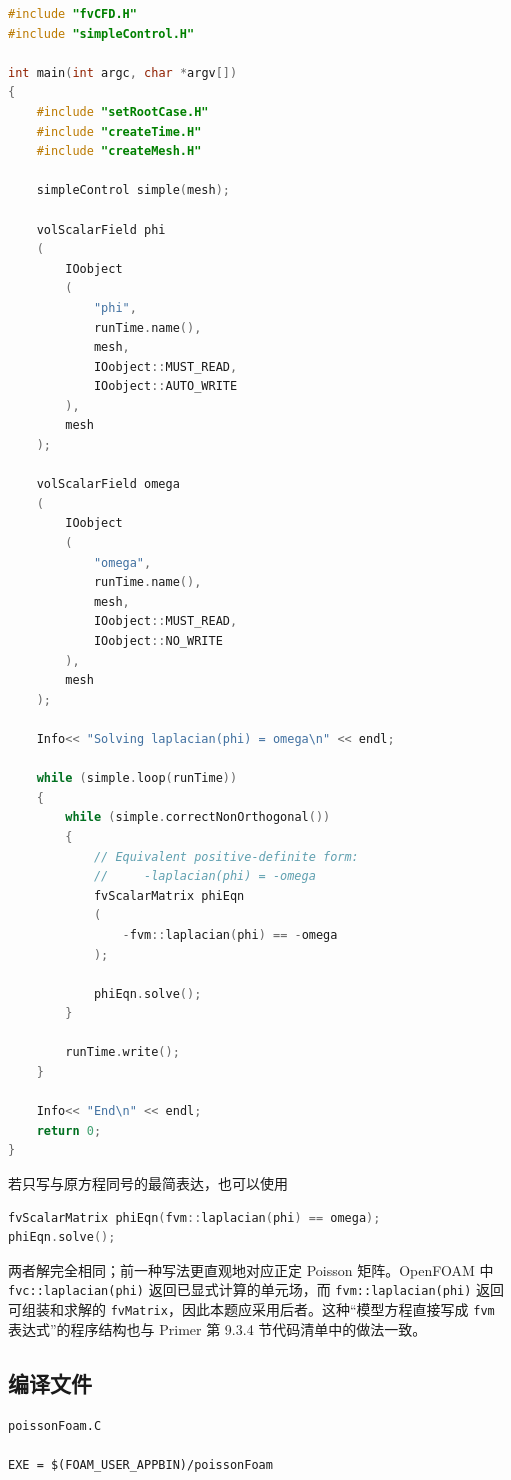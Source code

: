 \documentclass[UTF8,a4paper,11pt]{ctexart}
\begin{document}
\begin{lstlisting}[language=C++,caption={poissonFoam.C}]
#include "fvCFD.H"
#include "simpleControl.H"

int main(int argc, char *argv[])
{
    #include "setRootCase.H"
    #include "createTime.H"
    #include "createMesh.H"

    simpleControl simple(mesh);

    volScalarField phi
    (
        IOobject
        (
            "phi",
            runTime.name(),
            mesh,
            IOobject::MUST_READ,
            IOobject::AUTO_WRITE
        ),
        mesh
    );

    volScalarField omega
    (
        IOobject
        (
            "omega",
            runTime.name(),
            mesh,
            IOobject::MUST_READ,
            IOobject::NO_WRITE
        ),
        mesh
    );

    Info<< "Solving laplacian(phi) = omega\n" << endl;

    while (simple.loop(runTime))
    {
        while (simple.correctNonOrthogonal())
        {
            // Equivalent positive-definite form:
            //     -laplacian(phi) = -omega
            fvScalarMatrix phiEqn
            (
                -fvm::laplacian(phi) == -omega
            );

            phiEqn.solve();
        }

        runTime.write();
    }

    Info<< "End\n" << endl;
    return 0;
}
\end{lstlisting}

若只写与原方程同号的最简表达，也可以使用
\begin{lstlisting}[language=C++]
fvScalarMatrix phiEqn(fvm::laplacian(phi) == omega);
phiEqn.solve();
\end{lstlisting}
两者解完全相同；前一种写法更直观地对应正定 Poisson 矩阵。OpenFOAM 中
\texttt{fvc::\allowbreak laplacian(phi)} 返回已显式计算的单元场，而
\texttt{fvm::\allowbreak laplacian(phi)} 返回可组装和求解的
\texttt{fvMatrix}，因此本题应采用后者\cite[第 8.10.2 节]{Moukalled2016}。这种“模型方程直接写成 \texttt{fvm} 表达式”的程序结构也与 Primer 第 9.3.4 节代码清单中的做法一致\cite[第 9.3.4 节，第 288--291 页]{OFPrimer}。

\subsection{编译文件}

\begin{lstlisting}[language=OpenFOAM,caption={Make/files}]
poissonFoam.C

EXE = $(FOAM_USER_APPBIN)/poissonFoam
\end{lstlisting}
\end{document}
